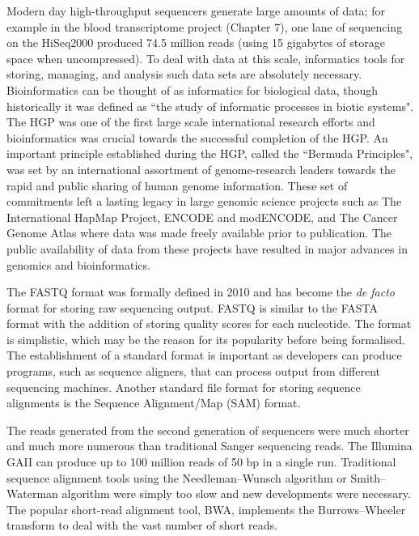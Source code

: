 Modern day high-throughput sequencers generate large amounts of data; for example in the blood transcriptome project (Chapter 7), one lane of sequencing on the HiSeq2000 produced 74.5 million reads (using 15 gigabytes of storage space when uncompressed). To deal with data at this scale, informatics tools for storing, managing, and analysis such data sets are absolutely necessary. Bioinformatics can be thought of as informatics for biological data, though historically it was defined as ``the study of informatic processes in biotic systems"\cite{pmid21483479}. The HGP was one of the first large scale international research efforts and bioinformatics was crucial towards the successful completion of the HGP\cite{stein1996perl}. An important principle established during the HGP, called the ``Bermuda Principles", was set by an international assortment of genome-research leaders towards the rapid and public sharing of human genome information. These set of commitments left a lasting legacy in large genomic science projects such as The International HapMap Project, ENCODE and modENCODE, and The Cancer Genome Atlas where data was made freely available prior to publication\cite{contreras2011bermuda}. The public availability of data from these projects have resulted in major advances in genomics and bioinformatics.

The FASTQ format was formally defined in 2010\cite{pmid20015970} and has become the \textit{de facto} format for storing raw sequencing output. FASTQ is similar to the FASTA format with the addition of storing quality scores for each nucleotide. The format is simplistic, which may be the reason for its popularity before being formalised. The establishment of a standard format is important as developers can produce programs, such as sequence aligners, that can process output from different sequencing machines. Another standard file format for storing sequence alignments is the Sequence Alignment/Map (SAM) format\cite{pmid19505943}.

The reads generated from the second generation of sequencers were much shorter and much more numerous than traditional Sanger sequencing reads. The Illumina GAII can produce up to 100 million reads of 50 bp in a single run. Traditional sequence alignment tools using the Needleman–Wunsch algorithm or Smith–Waterman algorithm were simply too slow and new developments were necessary. The popular short-read alignment tool, BWA\cite{pmid19451168}, implements the Burrows–Wheeler transform to deal with the vast number of short reads.

